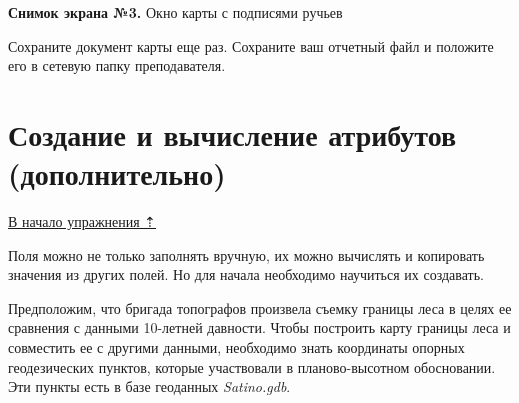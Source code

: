 \documentclass[12pt,]{book}
\begin{document}
\textbf{Снимок экрана №3.} Окно карты с подписями ручьев

Сохраните документ карты еще раз. Сохраните ваш отчетный файл и положите его в сетевую папку преподавателя.

\hypertarget{map-design-quaternary-calculation}{%
\section{Создание и вычисление атрибутов (дополнительно)}\label{map-design-quaternary-calculation}}

\protect\hyperlink{map-design-quaternary}{В начало упражнения ⇡}

Поля можно не только заполнять вручную, их можно вычислять и копировать значения из других полей. Но для начала необходимо научиться их создавать.

Предположим, что бригада топографов произвела съемку границы леса в целях ее сравнения с данными 10-летней давности. Чтобы построить карту границы леса и совместить ее с другими данными, необходимо знать координаты опорных геодезических пунктов, которые участвовали в планово-высотном обосновании. Эти пункты есть в базе геоданных \emph{Satino.gdb}.
\end{document}
